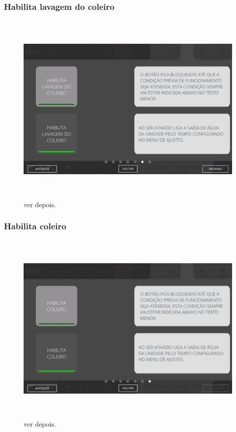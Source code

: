 \newpage
\thispagestyle{fancy}
\vspace*{\fill}
\subsubsection{\small{Habilita lavagem do coleiro}}
\begin{figure}[h]
  \centering
  \includegraphics[width=576px,height=360px]{src/imagesFlexo/07-fold/commands/e-6.png}
  \caption{ver depois.}
   \label{}
\end{figure}
\vspace*{\fill}

\newpage
\thispagestyle{fancy}
\vspace*{\fill}
\subsubsection{\small{Habilita coleiro}}
\begin{figure}[h]
  \centering
  \includegraphics[width=576px,height=360px]{src/imagesFlexo/07-fold/commands/e-7.png}
  \caption{ver depois.}
   \label{}
\end{figure}
\vspace*{\fill}